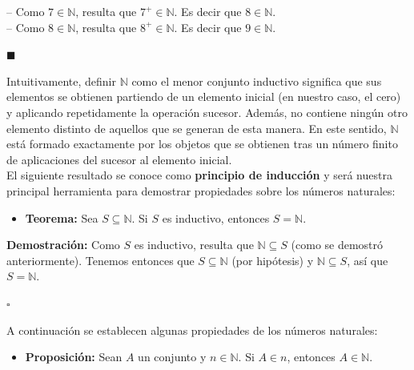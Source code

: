 \documentclass[10 pt]{article}
\begin{document}
{{-- Como $7 \in \mathbb N$, resulta que $7^+ \in \mathbb N$. Es decir que $8 \in \mathbb N$. \\

-- Como $8 \in \mathbb N$, resulta que $8^+ \in \mathbb N$. Es decir que $9 \in \mathbb N$.} \\

\begin{flushright}
    $\blacksquare$
\end{flushright}

\Large{Intuitivamente, definir $\mathbb N$ como el menor conjunto inductivo significa que sus elementos se obtienen partiendo de un elemento inicial (en nuestro caso, el cero) y aplicando repetidamente la operación sucesor. Además, no contiene ningún otro elemento distinto de aquellos que se generan de esta manera. En este sentido, $\mathbb N$ está formado exactamente por los objetos que se obtienen tras un número finito de aplicaciones del sucesor al elemento inicial.} \\

\Large{El siguiente resultado se conoce como \textbf{principio de inducción} y será nuestra principal herramienta para demostrar propiedades sobre los números naturales:} \\

\begin{itemize}
    \item \Large{\textbf{Teorema:} Sea $S \subseteq \mathbb N$. Si $S$ es inductivo, entonces $S=\mathbb N$.} \\
\end{itemize}

\Large{\textbf{Demostración:} Como $S$ es inductivo, resulta que $\mathbb N \subseteq S$ (como se demostró anteriormente). Tenemos entonces que $S \subseteq \mathbb N$ (por hipótesis) y $\mathbb N \subseteq S$, así que $S=\mathbb N$.} \\

\begin{flushright}
    $\square$
\end{flushright}

\Large{A continuación se establecen algunas propiedades de los números naturales:} \\

\begin{itemize}
    \item \Large{\textbf{Proposición:} Sean $A$ un conjunto y $n \in \mathbb N$. Si $A \in n$, entonces $A \in \mathbb N$.} \\
\end{itemize}

}
\end{document}
